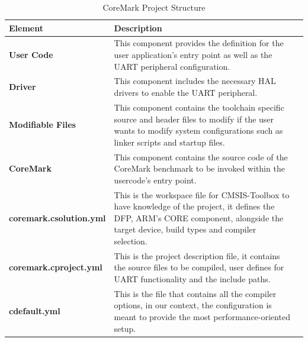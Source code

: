 \begin{table}[H]
	\centering
   	\caption{CoreMark Project Structure}
   	\label{tab:cm_prj_struct}
   	\begin{tabularx}{\linewidth}{@{}>{\bfseries}l X X@{}}
    \toprule
    Element & Description \\
    \midrule
    User Code & This component provides the definition for the user application's entry point as well as the UART peripheral configuration. \\
    \midrule
    Driver & This component includes the necessary HAL drivers to enable the UART peripheral. \\
    \midrule
    Modifiable Files & This component contains the toolchain specific source and header files to modify if the user wants to modify system configurations such as linker scripts and startup files. \\
    \midrule
    CoreMark & This component contains the source code of the CoreMark benchmark to be invoked within the usercode's entry point. \\
    \midrule
    coremark.csolution.yml & This is the workspace file for CMSIS-Toolbox to have knowledge of the project, it defines the DFP, ARM's CORE component, alongside the target device, build types and compiler selection. \\
    \midrule
    coremark.cproject.yml & This is the project description file, it contains the source files to be compiled, user defines for UART functionality and the include paths. \\
    \midrule
    cdefault.yml & This is the file that contains all the compiler options, in our context, the configuration is meant to provide the most performance-oriented setup. \\
    \bottomrule
   \end{tabularx}
\end{table}



